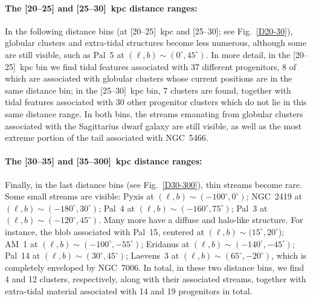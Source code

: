     \paragraph{The [20--25] and [25--30]~kpc distance ranges: }
    In the following distance bins (at [20--25]~kpc and [25--30]; see Fig.~\ref{D20-30}), globular clusters and extra-tidal structures become less numerous, although some are still visible, such as Pal~5 at $(\ell, b)\sim(0^{\circ},45^{\circ})$. In more detail, in the [20--25]~kpc bin we find tidal features associated  with 37 different progenitors, 8 of which are associated with globular clusters whose current positions are in the same distance bin; in the [25--30]~kpc bin, 7 clusters are found, together with tidal features associated with 30 other progenitor clusters which do not lie in this same distance range. In both bins, the streams emanating from globular clusters associated with the Sagittarius dwarf galaxy are still visible, as well as the most extreme portion of the tail associated with NGC~5466. 

    \paragraph{The [30--35] and [35--300]~kpc distance ranges: }
    Finally, in the last distance bins (see Fig.~\ref{D30-300}), thin streams become rare. Some small streams are visible: Pyxis at $(\ell, b)\sim(-100^{\circ},0^{\circ})$; NGC~2419 at $(\ell, b)\sim(-180^{\circ},30^{\circ})$; Pal~4 at $(\ell, b)\sim(-160^{\circ},75^{\circ})$; Pal~3 at $(\ell, b)\sim(-120^{\circ},45^{\circ})$. Many more have a diffuse and halo-like structure. For instance, the blob associated with Pal~15, centered at $(\ell, b)\sim (15^\circ, 20^\circ$); AM~1 at $(\ell, b)\sim(-100^{\circ},-55^{\circ})$; Eridanus at $(\ell, b)\sim(-140^{\circ},-45^{\circ})$; Pal~14 at $(\ell, b)\sim(30^{\circ},45^{\circ})$; Laevens~3 at $(\ell, b)\sim(65^\circ,-20^\circ)$, which is completely enveloped by NGC~7006. In total, in these two distance bins, we find 4 and 12 clusters, respectively, along with their associated streams, together with extra-tidal material associated with 14 and 19 progenitors in total. 


